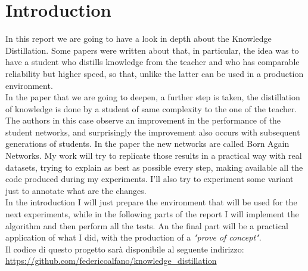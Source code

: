 \section{Introduction}
In this report we are going to have a look in depth about the Knowledge Distillation. Some papers were written about that, in particular, the idea was to have a student who distills knowledge from the teacher and who has comparable reliability but higher speed, so that, unlike the latter can be used in a production environment.\\
In the paper\cite{ban} that we are going to deepen, a further step is taken, the distillation of knowledge is done by a student of same complexity to the one of the teacher. The authors in this case observe an improvement in the performance of the student networks, and surprisingly the improvement also occurs with subsequent generations of students. In the paper the new networks are called Born Again Networks.
My work will try to replicate those results in a practical way with real datasets, trying to explain as best as possible every step, making available all the code produced during my experiments. I'll also try to 
experiment some variant just to annotate what are the changes.\\
In the introduction I will just prepare the environment that will be used for the next experiments, while in the following parts of the report I will implement the algorithm and then perform all the tests. An the final part will be a practical application of what I did, with the production of a \textit{"prove of concept"}.\\
Il codice di questo progetto sarà disponibile al seguente indirizzo: \url{https://github.com/federicoalfano/knowledge_distillation}

